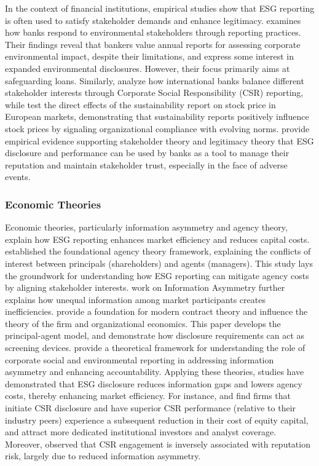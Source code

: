 \documentclass[
  authoryear]{elsarticle}
\begin{document}
In the context of financial institutions, empirical studies show that
ESG reporting is often used to satisfy stakeholder demands and enhance
legitimacy. \citet{THOMPSON2004} examines how banks respond to
environmental stakeholders through reporting practices. Their findings
reveal that bankers value annual reports for assessing corporate
environmental impact, despite their limitations, and express some
interest in expanded environmental disclosures. However, their focus
primarily aims at safeguarding loans. Similarly, \citet{SCHOLTENS2009}
analyze how international banks balance different stakeholder interests
through Corporate Social Responsibility (CSR) reporting, while
\citet{CARNEVALE2014} test the direct effects of the sustainability
report on stock price in European markets, demonstrating that
sustainability reports positively influence stock prices by signaling
organizational compliance with evolving norms. \citet{MURE2021} provide
empirical evidence supporting stakeholder theory and legitimacy theory
that ESG disclosure and performance can be used by banks as a tool to
manage their reputation and maintain stakeholder trust, especially in
the face of adverse events.

\subsubsection{Economic Theories}\label{economic-theories}

Economic theories, particularly information asymmetry and agency theory,
explain how ESG reporting enhances market efficiency and reduces capital
costs. \citet{JENSEN1976} established the foundational agency theory
framework, explaining the conflicts of interest between principals
(shareholders) and agents (managers). This study lays the groundwork for
understanding how ESG reporting can mitigate agency costs by aligning
stakeholder interests. \citet{AKERLOF1970} work on Information Asymmetry
further explains how unequal information among market participants
creates inefficiencies. \citet{HART1987} provide a foundation for modern
contract theory and influence the theory of the firm and organizational
economics. This paper develops the principal-agent model, and
demonstrate how disclosure requirements can act as screening devices.
\citet{GRAY1996} provide a theoretical framework for understanding the
role of corporate social and environmental reporting in addressing
information asymmetry and enhancing accountability. Applying these
theories, studies have demonstrated that ESG disclosure reduces
information gaps and lowers agency costs, thereby enhancing market
efficiency. For instance, \citet{DHALIWAL2011} and \citet{ELGHOUL2011}
find firms that initiate CSR disclosure and have superior CSR
performance (relative to their industry peers) experience a subsequent
reduction in their cost of equity capital, and attract more dedicated
institutional investors and analyst coverage. Moreover, \citet{CUI2018}
observed that CSR engagement is inversely associated with reputation
risk, largely due to reduced information asymmetry.
\end{document}
